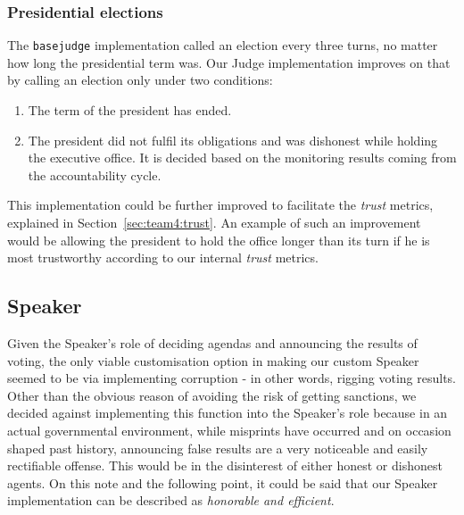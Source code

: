\subsubsection{Presidential elections}
The \texttt{basejudge} implementation called an election every three turns, no matter how long the presidential term was. Our Judge implementation improves on that by calling an election only under two conditions:
\begin{enumerate}
    \item The term of the president has ended.
    \item The president did not fulfil its obligations and was dishonest while holding the executive office. It is decided based on the monitoring results coming from the accountability cycle.
\end{enumerate}

This implementation could be further improved to facilitate the \emph{trust} metrics, explained in Section~\ref{sec:team4:trust}. An example of such an improvement would be allowing the president to hold the office longer than its turn if he is most trustworthy according to our internal \emph{trust} metrics.

\subsection{Speaker}
Given the Speaker's role of deciding agendas and announcing the results of voting, the only viable customisation option in making our custom Speaker seemed to be via implementing corruption - in other words, rigging voting results. Other than the obvious reason of avoiding the risk of getting sanctions, we decided against implementing this function into the Speaker's role because in an actual governmental environment, while misprints have occurred and on occasion shaped past history, announcing false results are a very noticeable and easily rectifiable offense. This would be in the disinterest of either honest or dishonest agents. On this note and the following point, it could be said that our Speaker implementation can be described as \emph{honorable and efficient}.

